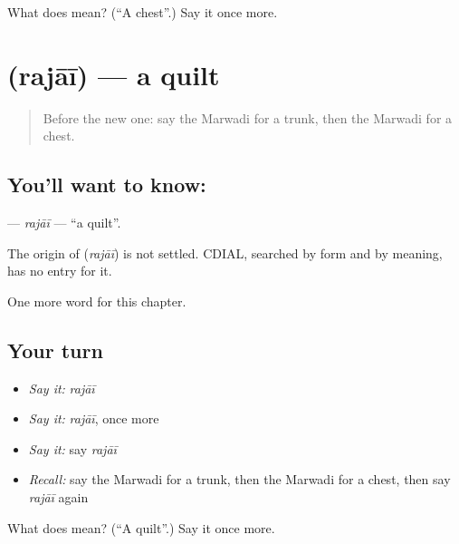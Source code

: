 \begin{tcolorbox}[breakable,colback=teal!4,colframe=teal!35!black,title={Before you move on}]
What does  mean? (\textquotedblleft{}A chest\textquotedblright{}.) Say it once more.
\end{tcolorbox}
\section[\texorpdfstring{\mw{रजाई} (rajāī)}{रजाई (rajāī)}]{ (rajāī) — a quilt}

\label{lesson:MW-C122-rajai}



\begin{quote}
Before the new one: say the Marwadi for a trunk, then the Marwadi for a chest.
\end{quote}

\subsection*{You'll want to know: }
\textbf{} — \emph{rajāī} — \textquotedblleft{}a quilt\textquotedblright{}.

\begin{cousinweb}
The origin of \textbf{} (\emph{rajāī}) is not settled. CDIAL, searched by form and by meaning, has no entry for it.
\end{cousinweb}

\begin{grammarlens}[title={What you've built}]
One more word for this chapter.
\end{grammarlens}

\subsection*{Your turn}
\begin{itemize}
\raggedright
  \item \emph{Say it:} \emph{rajāī}
  \item \emph{Say it:} \emph{rajāī}, once more
  \item \emph{Say it:} say \emph{rajāī}
  \item \emph{Recall:} say the Marwadi for a trunk, then the Marwadi for a chest, then say \emph{rajāī} again
\end{itemize}

\begin{tcolorbox}[breakable,colback=teal!4,colframe=teal!35!black,title={Before you move on}]
What does  mean? (\textquotedblleft{}A quilt\textquotedblright{}.) Say it once more.
\end{tcolorbox}

